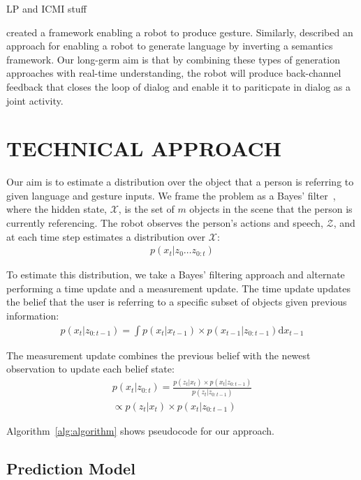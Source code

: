 \documentclass[letterpaper, 10 pt, conference]{ieeeconf}
\begin{document}
LP and ICMI stuff

\citet{dragan13} created a framework enabling a robot to produce
gesture.  Similarly, \citet{tellex14} described an approach for
enabling a robot to generate language by inverting a semantics
framework.  Our long-germ aim is that by combining these types of
generation approaches with real-time understanding, the robot will
produce back-channel feedback that closes the loop of dialog and
enable it to pariticpate in dialog as a joint activity.

\section{TECHNICAL APPROACH}

Our aim is to estimate a distribution over the object that a person is
referring to given language and gesture inputs.  We frame the problem
as a Bayes' filter~\citep{thrun08}, where the hidden state,
$\mathcal{X}$, is the set of $m$ objects in the scene that the person
is currently referencing. The robot observes the person's actions and
speech, $\mathcal{Z}$, and at each time step estimates a distribution
over $\mathcal{X}$:
\begin{align}
  p(x_t | z_0 \dots z_{0:t})
\end{align}


To estimate this distribution, we take a Bayes' filtering approach and
alternate performing a time update and a measurement update.  The time
update updates the belief that the user is referring to a specific
subset of objects given previous information:
\begin{align}
p(x_t | z_{0:t-1}) = \int p(x_t|x_{t-1})\times p(x_{t-1} | z_{0:t-1}) \text{d}x_{t-1}
\end{align}

The measurement update combines the previous belief with the newest observation to update each belief state: 
\begin{align}
p(x_t |z_{0:t}) = \frac{p(z_t | x_t) \times p(x_t | z_{0:t-1})}{p(z_t | z_{0:t-1})} \\\propto p(z_t | x_t) \times p(x_t | z_{0:t-1})
\end{align}

Algorithm~\ref{alg:algorithm} shows pseudocode for our approach.


\subsection{Prediction Model}
\end{document}

